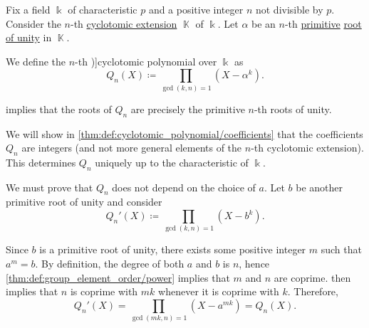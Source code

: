 \begin{definition}\label{def:cyclotomic_polynomial}
  Fix a field \( \Bbbk \) of characteristic \( p \) and a positive integer \( n \) not divisible by \( p \). Consider the \( n \)-th \hyperref[def:cyclotomic_extension]{cyclotomic extension} \( \BbbK \) of \( \Bbbk \). Let \( \alpha \) be an \( n \)-th \hyperref[def:primitive_root_of_unity]{primitive} \hyperref[def:root_of_unity]{root of unity} in \( \BbbK \).

  We define the \( n \)-th \term[ru=круговой / циклотомический (многочлен) (\cite[130]{Тыртышников2017ОсновыАлгебры})]{cyclotomic polynomial} over \( \Bbbk \) as
  \begin{equation}\label{eq:def:cyclotomic_polynomial}
    Q_n(X) \coloneqq \prod_{\gcd(k, n) = 1} (X - \alpha^k).
  \end{equation}
\end{definition}
\begin{comments}
  \item {} implies that the roots of \( Q_n \) are precisely the primitive \( n \)-th roots of unity.
  \item We will show in \cref{thm:def:cyclotomic_polynomial/coefficients} that the coefficients \( Q_n \) are integers (and not more general elements of the \( n \)-th cyclotomic extension). This determines \( Q_n \) uniquely up to the characteristic of \( \Bbbk \).
\end{comments}
\begin{defproof}
  We must prove that \( Q_n \) does not depend on the choice of \( a \). Let \( b \) be another primitive root of unity and consider
  \begin{equation*}
    Q_n'(X) \coloneqq \prod_{\gcd(k, n) = 1} (X - b^k).
  \end{equation*}

  Since \( b \) is a primitive root of unity, there exists some positive integer \( m \) such that \( a^m = b \). By definition, the degree of both \( a \) and \( b \) is \( n \), hence \cref{thm:def:group_element_order/power} implies that \( m \) and \( n \) are coprime.  then implies that \( n \) is coprime with \( mk \) whenever it is coprime with \( k \). Therefore,
  \begin{equation*}
    Q_n'(X) = \prod_{\gcd(mk, n) = 1} (X - a^{mk}) = Q_n(X).
  \end{equation*}
\end{defproof}

